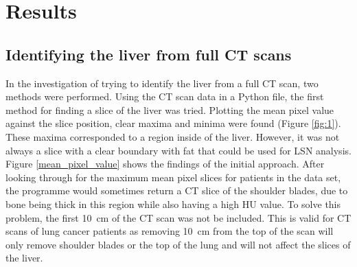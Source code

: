 \documentclass[12pt]{article}
\begin{document}
\section{Results}
\subsection{Identifying the liver from full CT scans}

In the investigation of trying to identify the liver from a full CT scan, two methods were performed. Using the CT scan data in a Python file, the first method for finding a slice of the liver was tried. Plotting the mean pixel value against the slice position, clear maxima and minima were found (Figure \ref{fig:1}). These maxima corresponded to a region inside of the liver. However, it was not always a slice with a clear boundary with fat that could be used for LSN analysis. Figure \ref{mean_pixel_value} shows the findings of the initial approach. After looking through for the maximum mean pixel slices for patients in the data set, the programme would sometimes return a CT slice of the shoulder blades, due to bone being thick in this region while also having a high HU value. To solve this problem, the first \hbox{10 cm} of the CT scan was not be included.
This is valid for CT scans of lung cancer patients as removing \hbox{10 cm} from the top of the scan will only remove shoulder blades or the top of the lung and will not affect the slices of the liver. 
\\ \\
\end{document}
